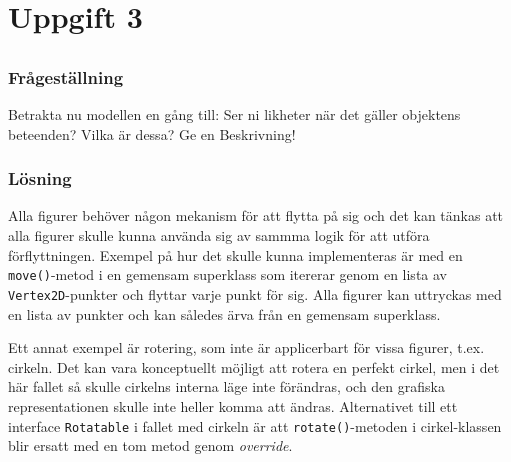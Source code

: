 %
%
%

\renewcommand{\thesubsection}{(\alph{subsection})}

\section{Uppgift 3}\label{sec:uppg3}

\subsection{}\label{sec:uppg3a}
\subsubsection*{Frågeställning}
Betrakta nu modellen en gång till: Ser ni likheter när det gäller objektens
beteenden? Vilka är dessa? Ge en Beskrivning!

\subsubsection*{Lösning}
Alla figurer behöver någon mekanism för att flytta på sig och det kan tänkas
att alla figurer skulle kunna använda sig av sammma logik för att utföra
förflyttningen. Exempel på hur det skulle kunna implementeras är med en
\texttt{move()}-metod i en gemensam superklass som itererar genom en lista av
\texttt{Vertex2D}-punkter och flyttar varje punkt för sig. Alla figurer kan
uttryckas med en lista av punkter och kan således ärva från en gemensam
superklass.
\par Ett annat exempel är rotering, som inte är applicerbart för vissa figurer,
t.ex. cirkeln. Det kan vara konceptuellt möjligt att rotera en perfekt cirkel,
men i det här fallet så skulle cirkelns interna läge inte förändras, och
den grafiska representationen skulle inte heller komma att ändras.
Alternativet till ett interface \texttt{Rotatable} i fallet med cirkeln är att
\texttt{rotate()}-metoden i cirkel-klassen blir ersatt med en tom metod genom 
\emph{override}.


